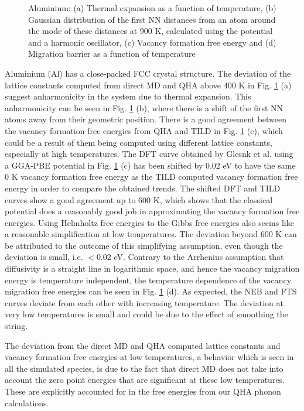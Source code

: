 \documentclass{article}
\begin{document}
\begin{figure}[!htp]
\caption{Aluminium: (a) Thermal expansion as a function of temperature, (b) Gaussian distribution of the first NN distances from an atom around the mode of these distances at 900 K, calculated using the potential \cite{Mendelev2009a} and a harmonic oscillator, (c) Vacancy formation free energy and (d) Migration barrier as a function of temperature}
\label{fig:9}
\end{figure}

\noindent Aluminium (Al) has a close-packed FCC crystal structure. The deviation of the lattice constants computed from direct MD and QHA above 400 K in Fig. \ref{fig:9} (a) suggest anharmonicity in the system due to thermal expansion. This anharmonicity can be seen in Fig. \ref{fig:9} (b), where there is a shift of the first NN atoms away from their geometric position. There is a good agreement between the vacancy formation free energies from QHA and TILD in Fig. \ref{fig:9} (c), which could be a result of them being computed using different lattice constants, especially at high temperatures. The DFT curve obtained by Glesnk et al. \cite{Glensk2013} using a GGA-PBE potential in Fig. \ref{fig:9} (c) has been shifted by 0.02 eV to have the same 0 K vacancy formation free energy as the TILD computed vacancy formation free energy in order to compare the obtained trends. The shifted DFT and TILD curves show a good agreement up to 600 K, which shows that the classical potential does a reasonably good job in approximating the vacancy formation free energies. Using Helmholtz free energies to the Gibbs free energies also seems like a reasonable simplification at low temperatures. The deviation beyond 600 K can be attributed to the outcome of this simplifying assumption, even though the deviation is small, i.e. $<$0.02 eV. Contrary to the Arrhenius assumption that diffusivity is a straight line in logarithmic space, and hence the vacancy migration energy is temperature independent, the temperature dependence of the vacancy migration free energies can be seen in Fig. \ref{fig:9} (d). As expected, the NEB and FTS curves deviate from each other with increasing temperature. The deviation at very low temperatures is small and could be due to the effect of smoothing the string.

The deviation from the direct MD and QHA computed lattice constants and vacancy formation free energies at low temperatures, a behavior which is seen in all the simulated species, is due to the fact that direct MD does not take into account the zero point energies that are significant at these low temperatures. These are explicitly accounted for in the free energies from our QHA phonon calculations.
\end{document}
